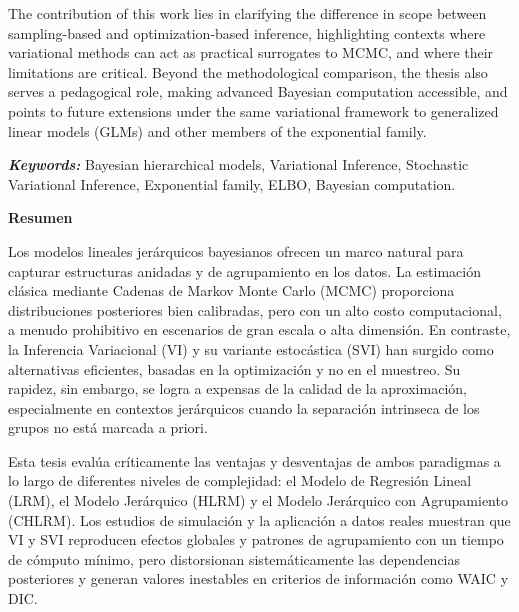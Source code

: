 \vspace{0.5 cm}

The contribution of this work lies in clarifying the difference in scope between sampling-based and optimization-based inference, highlighting contexts where variational methods can act as practical surrogates to MCMC, and where their limitations are critical. Beyond the methodological comparison, the thesis also serves a pedagogical role, making advanced Bayesian computation accessible, and points to future extensions under the same variational framework to generalized linear models (GLMs) and other members of the exponential family.

\vspace{0.5 cm}

\textbf{\small \textit{Keywords:}} Bayesian hierarchical models, Variational Inference, Stochastic Variational Inference, Exponential family, ELBO, Bayesian computation.

\newpage

\textbf{\LARGE Resumen}

Los modelos lineales jerárquicos bayesianos ofrecen un marco natural para capturar estructuras anidadas y de agrupamiento en los datos. La estimación clásica mediante Cadenas de Markov Monte Carlo (MCMC) proporciona distribuciones posteriores bien calibradas, pero con un alto costo computacional, a menudo prohibitivo en escenarios de gran escala o alta dimensión. En contraste, la Inferencia Variacional (VI) y su variante estocástica (SVI) han surgido como alternativas eficientes, basadas en la optimización y no en el muestreo. Su rapidez, sin embargo, se logra a expensas de la calidad de la aproximación, especialmente en contextos jerárquicos cuando la separación intrinseca de los grupos no está marcada a priori.  

\vspace{0.5 cm}

Esta tesis evalúa críticamente las ventajas y desventajas de ambos paradigmas a lo largo de diferentes niveles de complejidad: el Modelo de Regresión Lineal (LRM), el Modelo Jerárquico (HLRM) y el Modelo Jerárquico con Agrupamiento (CHLRM). Los estudios de simulación y la aplicación a datos  reales muestran que VI y SVI reproducen efectos globales y patrones de agrupamiento con un tiempo de cómputo mínimo, pero distorsionan sistemáticamente las dependencias posteriores y generan valores inestables en criterios de información como WAIC y DIC.  

\vspace{0.5 cm}

